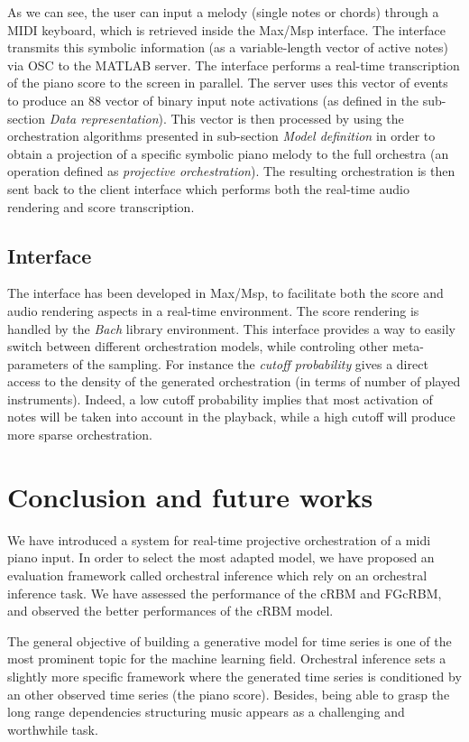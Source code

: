 \documentclass[letterpaper]{article}
\begin{document}
As we can see, the user can input a melody (single notes or chords)
through a MIDI keyboard, which is retrieved inside the Max/Msp interface.
The interface transmits this symbolic information (as a variable-length
vector of active notes) via OSC to the MATLAB server. The interface
performs a real-time transcription of the piano score to the screen
in parallel. The server uses this vector of events to produce an 88
vector of binary input note activations (as defined in the sub-section \textit{Data representation}).
This vector is then processed by using the orchestration algorithms
presented in sub-section \textit{Model definition} in order to obtain a projection
of a specific symbolic piano melody to the full orchestra (an operation
defined as \emph{projective orchestration}). The resulting orchestration
is then sent back to the client interface which performs both the
real-time audio rendering and score transcription. 

\subsection{Interface}
The interface has been developed in Max/Msp, to facilitate both the
score and audio rendering aspects in a real-time environment. The
score rendering is handled by the \emph{Bach} library environment. 
This interface provides a way to easily switch between different orchestration models, while controling other
meta-parameters of the sampling. For instance the \emph{cutoff probability
}gives a direct access to the density of the generated orchestration
(in terms of number of played instruments). Indeed, a low cutoff probability
implies that most activation of notes will be taken into account in
the playback, while a high cutoff will produce more sparse orchestration.

\section{Conclusion and future works}
We have introduced a system for real-time projective orchestration of a midi piano input. In order to select the most adapted model, we have proposed an evaluation framework called orchestral inference which rely on an orchestral inference task. We have assessed the performance of the cRBM and FGcRBM, and observed the better performances of the cRBM model.

The general objective of building a generative model for time series is one of the most prominent topic for the machine learning field. Orchestral inference sets a slightly more specific framework where the generated time series is conditioned by an other observed time series (the piano score). Besides, being able to grasp the long range dependencies structuring music appears as a challenging and worthwhile task.
\end{document}

